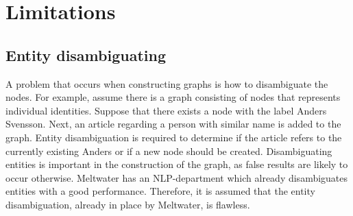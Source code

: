 \section{Limitations}
\subsection{Entity disambiguating}
A problem that occurs when constructing graphs is how to disambiguate the nodes. For example, assume there is a graph consisting of nodes that represents individual identities. Suppose that there exists a node with the label Anders Svensson. Next, an article regarding a person with similar name is added to the graph. Entity disambiguation is required to determine if the article refers to the currently existing Anders or if a new node should be created. Disambiguating entities is important in the construction of the graph, as false results are likely to occur otherwise. Meltwater has an NLP-department which already disambiguates entities with a good performance. Therefore, it is assumed that the entity disambiguation, already in place by Meltwater, is flawless. 